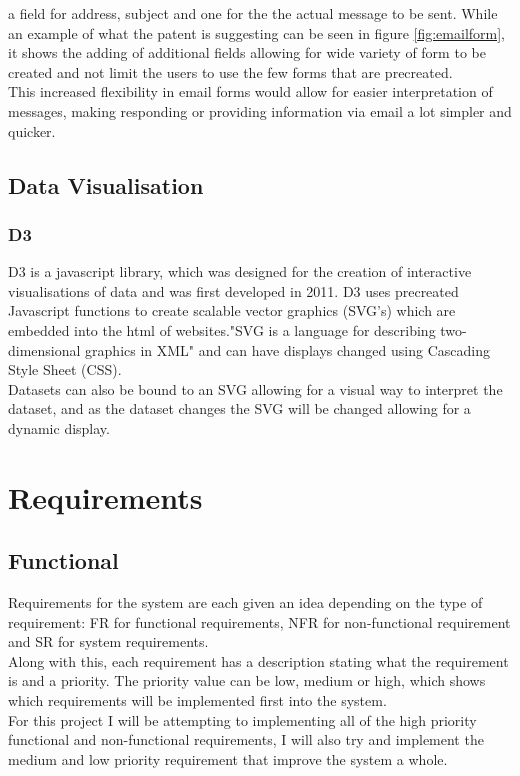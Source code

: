 \documentclass[12pt]{article}  %
\begin{document}
\noindent
a field for address, subject and one for the the actual message to be sent. While an example of what the patent is suggesting can be seen in figure \ref{fig:emailform}, it shows the adding of additional fields allowing for wide variety of form to be created and not limit the  users to use the few forms that are precreated.\\
This increased flexibility in email forms would allow for easier  interpretation of messages, making responding or providing information via email a lot simpler and quicker.


\subsection{Data Visualisation}
\subsubsection{D3}
D3 \cite{bostock_d3.js_????} is a javascript library, which was designed for the creation of interactive visualisations of data and was first developed in 2011. D3 uses precreated Javascript functions to create scalable vector graphics (SVG's) which are embedded into the html of websites."SVG is a language for describing two-dimensional graphics in XML"\cite{ferraiolo_scalable_2000} and can have displays changed  using Cascading Style Sheet (CSS).  \\
Datasets can also be bound to an SVG allowing for a visual way to interpret the dataset, and as the dataset changes the SVG will be changed allowing for a dynamic display.  






\newpage
\section{Requirements}
 


\subsection{Functional}
Requirements for the system are each given an idea depending on the type of requirement: FR for functional requirements, NFR for non-functional requirement and SR for system requirements.\\
Along with this, each requirement has a description stating what the requirement is and a priority. The priority value can be low, medium or high, which shows which requirements will be implemented first into the system.\\
For this project I will be attempting to implementing all of the high priority functional and non-functional requirements, I will also try and implement the medium and low priority requirement that improve the system a whole. 
\end{document}
